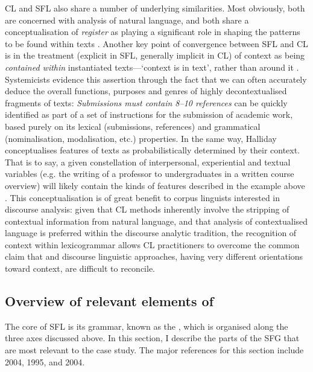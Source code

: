 \gls{CL} and \gls{SFL} also share a number of underlying similarities. Most obviously, both are concerned with analysis of natural language, and both share a conceptualisation of \emph{register} as playing a significant role in shaping the  patterns to be found within texts \cite{hunston_systemic_2013}. Another key point of convergence between \gls{SFL} and \gls{CL} is in the treatment (explicit in \gls{SFL}, generally implicit in \gls{CL}) of context as being \emph{contained within} instantiated texts---`context is in text', rather than around it \cite{eggins_introduction_2004}. Systemicists evidence this assertion through the fact that we can often accurately deduce the overall functions, purposes and genres of highly decontextualised fragments of texts: \emph{Submissions must contain 8--10 references} can be quickly identified as part of a set of instructions for the submission of academic work, based purely on its lexical (submissions, references) and grammatical (nominalisation, modalisation, etc.) properties. In the same way, Halliday conceptualises  features of texts as probabilistically determined by their context. That is to say, a given constellation of interpersonal, experiential and textual variables (e.g. the writing of a professor to undergraduates in a written course overview) will likely contain the kinds of  features described in the example above \cite{halliday_corpus_1991}. This conceptualisation is of great benefit to corpus linguists interested in discourse analysis: given that \gls{CL} methods inherently involve the stripping of contextual information from natural language, and that analysis of contextualised language is preferred within the discourse analytic tradition, the recognition of context within \gls{lexicogrammar} allows \gls{CL} practitioners to overcome the common claim  \cite[e.g.][]{virtanen_discourse_2009} that  and discourse linguistic approaches, having very different orientations toward context, are difficult to reconcile.

\subsection{Overview of relevant elements of }

The core of \gls{SFL} is its grammar, known as the , which is organised along the three axes discussed above. In this section, I describe the parts of the \gls{SFG} that are most relevant to the case study. The major references for this section include \citeauthor{halliday_introduction_2004} 2004, \citeauthor{matthiessen_lexicogrammatical_1995} 1995, and \citeauthor{eggins_introduction_2004} 2004.

